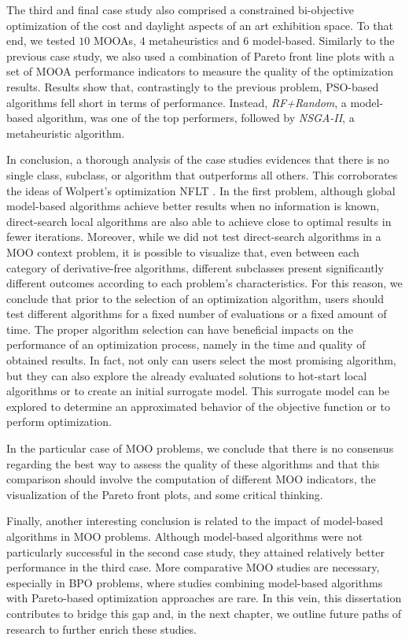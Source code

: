 The third and final case study also comprised a constrained bi-objective optimization of the cost and daylight aspects of an art exhibition space. To that end, we tested $10$ \acp{MOOA}, $4$ metaheuristics and $6$ model-based. Similarly to the previous case study, we also used a combination of Pareto front line plots with a set of \ac{MOOA} performance indicators to measure the quality of the optimization results. Results show that, contrastingly to the previous problem, \ac{PSO}-based algorithms fell short in terms of performance. Instead, \textit{RF+Random}, a model-based algorithm, was one of the top performers, followed by \textit{NSGA-II}, a metaheuristic algorithm. 

In conclusion, a thorough analysis of the case studies evidences that there is no single class, subclass, or algorithm that outperforms all others. This corroborates the ideas of Wolpert's optimization \ac{NFLT} \cite{Wolpert1997NFLT}. In the first problem, although global model-based algorithms achieve better results when no information is known, direct-search local algorithms are also able to achieve close to optimal results in fewer iterations. Moreover, while we did not test direct-search algorithms in a \ac{MOO} context problem, it is possible to visualize that, even between each category of derivative-free algorithms, %
different subclasses present significantly different outcomes according to each problem's characteristics. For this reason, we conclude that prior to the selection of an optimization algorithm, users should test different algorithms for a fixed number of evaluations or a fixed amount of time. The proper algorithm selection can have beneficial impacts on the performance of an optimization process, namely in the time and quality of obtained results. In fact, not only can users select the most promising algorithm, but they can also explore the already evaluated solutions to hot-start local algorithms or to create an initial surrogate model. This surrogate model can be explored to determine an approximated behavior of the objective function or to perform optimization. 

In the particular case of \ac{MOO} problems, we conclude that there is no consensus regarding the best way to assess the quality of these algorithms and that this comparison should involve the computation of different \ac{MOO} indicators, the visualization of the Pareto front plots, and some critical thinking. 

Finally, another interesting conclusion is related to the impact of model-based algorithms in \ac{MOO} problems. Although model-based algorithms were not particularly successful in the second case study, they attained relatively better performance in the third case. More comparative \ac{MOO} studies are necessary, especially in \ac{BPO} problems, where studies combining model-based algorithms with Pareto-based optimization approaches are rare. In this vein, this dissertation contributes to bridge this gap and, in the next chapter, we outline future paths of research to further enrich these studies.